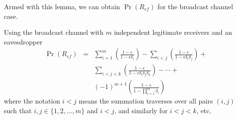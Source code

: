 \documentclass[10pt,twocolumn,twoside]{IEEEtran} \newlength{\pic}
\theoremstyle{definition}
\theoremstyle{remark}
\theoremstyle{plain}
\begin{document}
Armed with this lemma, we can obtain $\Pr(R_{ef})$ for the broadcast channel case.
\begin{lemma}\label{thm:3}
 Using the broadcast channel with $m$ independent legitimate receivers and an eavesdropper
 \begin{eqnarray}\label{eq:thm3}
  \Pr(R_{ef}) &=& \sum_{i=1}^m\left(\frac{1-\epsilon}{1-\epsilon\delta_i}\right) - \sum_{i<j}\left(\frac{1-\epsilon}{1-\epsilon\delta_i\delta_j}\right) + \nonumber \\ && \sum_{i<j<k}\left(\frac{1-\epsilon}{1-\epsilon\delta_i\delta_j\delta_k}\right)  - \cdots + \nonumber \\ && (-1)^{m+1}\left(\frac{1-\epsilon}{1-\prod_{i=1}^m\delta_i}\right)\nonumber
 \end{eqnarray}
 where the notation $i<j$ means the summation traverses over all pairs $(i,j)$ such that $i,j\in\{1,2,\ldots,m\}$ and $i<j$, and similarly for $i<j<k$, etc.
\end{lemma}
\end{document}
